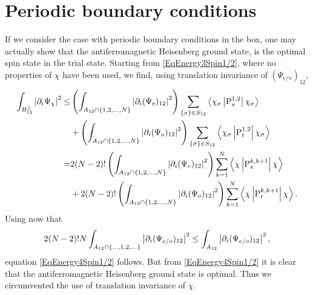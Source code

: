 \appendix
\chapter{Periodic boundary conditions}
\label{AppendixPeriodicBCSpin1/2}
If we consider the case with periodic boundary conditions in the box, one may actually show that the antiferromagnetic Heisenberg ground state, is the optimal spin state in the trial state. Starting from \eqref{EqEnergy3Spin1/2}, where no properties of $ \chi $ have been used, we find, using translation invariance of $ (\Psi_{e/o})_{12} $,
\begin{equation}\label{EqPeriodicUpperBound1}
\begin{aligned}
\int_{B_{12}^{\geq}}\left\lvert \partial_i\Psi_{\chi} \right\rvert^2\leq&\left(\int_{A_{12}\cap\{1,2,\ldots,N\}}\left\lvert \partial_i(\Psi_e)_{12} \right\rvert^2\right)\sum_{\{\sigma\}\in S_{12}}\left\langle\chi_{\sigma} \left\lvert \operatorname{P}^{1,2}_s  \right\rvert \chi_\sigma\right\rangle\\
&+\left(\int_{A_{12}\cap \{1,2,\ldots,N\}}\left\lvert \partial_i(\Psi_o)_{12} \right\rvert^2\right)\sum_{\{\sigma\}\in S_{12}}\left\langle\chi_{\sigma} \left\lvert \operatorname{P}^{1,2}_t  \right\rvert \chi_\sigma\right\rangle\\
=&2(N-2)!\left(\int_{A_{12}\cap\{1,2,\ldots,N\}}\left\lvert \partial_i(\Psi_e)_{12} \right\rvert^2\right)\sum_{k=1}^{N}\left\langle\chi \left\lvert \operatorname{P}^{k,k+1}_s  \right\rvert \chi\right\rangle\\
&+2(N-2)!\left(\int_{A_{12}\cap \{1,2,\ldots,N\}}\left\lvert \partial_i(\Psi_o)_{12} \right\rvert^2\right)\sum_{k=1}^{N}\left\langle\chi \left\lvert \operatorname{P}^{k,k+1}_t  \right\rvert \chi\right\rangle.
\end{aligned}
\end{equation}
Using now that \begin{equation}
2(N-2)!N\int_{A_{12}\cap \{\ldots,1,2,\ldots\}}\left\lvert \partial_i(\Psi_{e/o})_{12} \right\rvert^2\leq \int_{A_{12}}\left\lvert \partial_i(\Psi_{e/o})_{12} \right\rvert^2,
\end{equation}
equation \eqref{EqEnergy4Spin1/2} follows.
But from \eqref{EqEnergy4Spin1/2} it is clear that the antiferromagnetic Heisenberg ground state is optimal. Thus we circumvented the use of translation invariance of $ \chi $.



